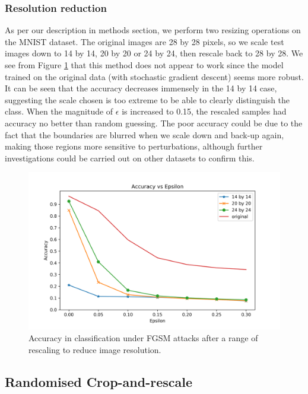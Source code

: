 \subsubsection{Resolution reduction}

As per our description in methods section, we perform two resizing operations on the MNIST dataset. The original images are 28 by 28 pixels, so we scale test images down to 14 by 14, 20 by 20 or 24 by 24, then rescale back to 28 by 28.  We see from Figure \ref{fig:resolution} that this method does not appear to work since the model trained on the original data (with stochastic gradient descent) seems more robust. It can be seen that the accuracy decreases immensely in the 14 by 14 case, suggesting the scale chosen is too extreme to be able to clearly distinguish the class. When the magnitude of \(\epsilon\) is increased to 0.15, the rescaled samples had accuracy no better than random guessing. The poor accuracy could be due to the fact that the boundaries are blurred when we scale down and back-up again, making those regions more sensitive to perturbations, although further investigations could be carried out on other datasets to confirm this.

\begin{figure}[h!]
\includegraphics[width=\textwidth]{rescaled_adam}
		\caption{Accuracy in classification under FGSM attacks after a range of rescaling to reduce image resolution.}
		\label{fig:resolution}

\end{figure}

\subsection{Randomised Crop-and-rescale}


